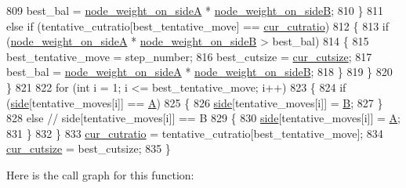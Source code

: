 \begin{DoxyCode}
809         best\_bal = \mbox{\hyperlink{classratio__cut__partition_af1b839e48e498cf8ca93c8ec5df8a686}{node\_weight\_on\_sideA}} * 
      \mbox{\hyperlink{classratio__cut__partition_aa16d1b508db86eb0ba4824642394999a}{node\_weight\_on\_sideB}};
810     \}
811     \textcolor{keywordflow}{else} \textcolor{keywordflow}{if} (tentative\_cutratio[best\_tentative\_move] == \mbox{\hyperlink{classratio__cut__partition_a9dad324884cef5bcdd50122fc98e0860}{cur\_cutratio}})
812     \{
813         \textcolor{keywordflow}{if} (\mbox{\hyperlink{classratio__cut__partition_af1b839e48e498cf8ca93c8ec5df8a686}{node\_weight\_on\_sideA}} * \mbox{\hyperlink{classratio__cut__partition_aa16d1b508db86eb0ba4824642394999a}{node\_weight\_on\_sideB}} > best\_bal)
814         \{
815         best\_tentative\_move = step\_number;
816         best\_cutsize = \mbox{\hyperlink{classratio__cut__partition_aa01f2d6257fff28739e2431fe826ef71}{cur\_cutsize}};
817         best\_bal = \mbox{\hyperlink{classratio__cut__partition_af1b839e48e498cf8ca93c8ec5df8a686}{node\_weight\_on\_sideA}} * 
      \mbox{\hyperlink{classratio__cut__partition_aa16d1b508db86eb0ba4824642394999a}{node\_weight\_on\_sideB}};
818         \}
819     \}
820     \}
821 
822     \textcolor{keywordflow}{for} (\textcolor{keywordtype}{int} i = 1; i <= best\_tentative\_move; i++)
823     \{
824     \textcolor{keywordflow}{if} (\mbox{\hyperlink{classratio__cut__partition_a2bf913d1d8607747885177a3b585e611}{side}}[tentative\_moves[i]] == \mbox{\hyperlink{classratio__cut__partition_a9c0da5ad845b01bddbc1f238fa35cdd0}{A}})
825     \{
826         \mbox{\hyperlink{classratio__cut__partition_a2bf913d1d8607747885177a3b585e611}{side}}[tentative\_moves[i]] = \mbox{\hyperlink{classratio__cut__partition_adf075987228d8adc7950d5b1ba332daa}{B}};
827     \}
828     \textcolor{keywordflow}{else}    \textcolor{comment}{// side[tentative\_moves[i]] == B}
829     \{
830         \mbox{\hyperlink{classratio__cut__partition_a2bf913d1d8607747885177a3b585e611}{side}}[tentative\_moves[i]] = \mbox{\hyperlink{classratio__cut__partition_a9c0da5ad845b01bddbc1f238fa35cdd0}{A}};
831     \}
832     \}
833     \mbox{\hyperlink{classratio__cut__partition_a9dad324884cef5bcdd50122fc98e0860}{cur\_cutratio}} = tentative\_cutratio[best\_tentative\_move];
834     \mbox{\hyperlink{classratio__cut__partition_aa01f2d6257fff28739e2431fe826ef71}{cur\_cutsize}} = best\_cutsize;
835 \}
\end{DoxyCode}
Here is the call graph for this function\+:\nopagebreak
